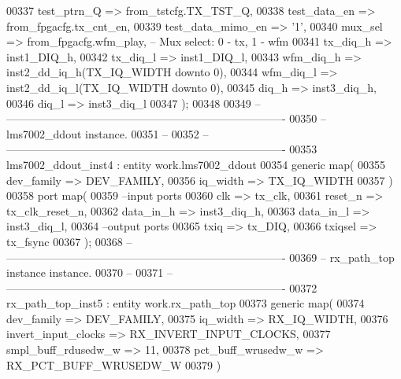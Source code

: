 \begin{DoxyCode}
00337       test_ptrn_Q       => from\_tstcfg.TX\_TST\_Q,
00338       test_data_en      => from\_fpgacfg.tx\_cnt\_en,
00339       test_data_mimo_en => '1',
00340       mux_sel           => from\_fpgacfg.wfm\_play,\textcolor{keyword}{   -- Mux select: 0 - tx, 1 - wfm}
00341       tx_diq_h          => inst1_DIQ_h,
00342       tx_diq_l          => inst1_DIQ_l,
00343       wfm_diq_h         => inst2_dd_iq_h\textcolor{vhdlchar}{(}TX_IQ_WIDTH \textcolor{keywordflow}{downto} \textcolor{vhdllogic}{0}\textcolor{vhdlchar}{)},
00344       wfm_diq_l         => inst2_dd_iq_l\textcolor{vhdlchar}{(}TX_IQ_WIDTH \textcolor{keywordflow}{downto} \textcolor{vhdllogic}{0}\textcolor{vhdlchar}{)},
00345       diq_h             => inst3_diq_h,
00346       diq_l             => inst3_diq_l
00347    \textcolor{vhdlchar}{)};
00348    
00349 \textcolor{keyword}{-- ----------------------------------------------------------------------------}
00350 \textcolor{keyword}{-- lms7002\_ddout instance.}
00351 \textcolor{keyword}{-- }
00352 \textcolor{keyword}{-- ----------------------------------------------------------------------------   }
00353    lms7002\_ddout\_inst4 : \textcolor{keywordflow}{entity} work.lms7002_ddout
00354    \textcolor{keywordflow}{generic} \textcolor{keywordflow}{map}( 
00355       dev_family     => DEV_FAMILY,
00356       iq_width       => TX_IQ_WIDTH
00357    \textcolor{vhdlchar}{)}
00358    \textcolor{keywordflow}{port} \textcolor{keywordflow}{map}(
00359 \textcolor{keyword}{      --input ports }
00360       clk            => tx_clk,
00361       reset_n        => tx_clk_reset_n,
00362       data_in_h      => inst3_diq_h,
00363       data_in_l      => inst3_diq_l,
00364 \textcolor{keyword}{      --output ports }
00365       txiq           => tx_DIQ,
00366       txiqsel        => tx_fsync
00367    \textcolor{vhdlchar}{)};  
00368 \textcolor{keyword}{-- ----------------------------------------------------------------------------}
00369 \textcolor{keyword}{-- rx\_path\_top instance instance.}
00370 \textcolor{keyword}{-- }
00371 \textcolor{keyword}{-- ----------------------------------------------------------------------------   }
00372    rx\_path\_top\_inst5 : \textcolor{keywordflow}{entity} work.rx_path_top
00373    \textcolor{keywordflow}{generic} \textcolor{keywordflow}{map}( 
00374       dev_family           => DEV_FAMILY,
00375       iq_width             => RX_IQ_WIDTH,
00376       invert_input_clocks  => RX_INVERT_INPUT_CLOCKS,
00377       smpl_buff_rdusedw_w  => \textcolor{vhdllogic}{11}, 
00378       pct_buff_wrusedw_w   => RX_PCT_BUFF_WRUSEDW_W
00379    \textcolor{vhdlchar}{)}

\end{DoxyCode}
